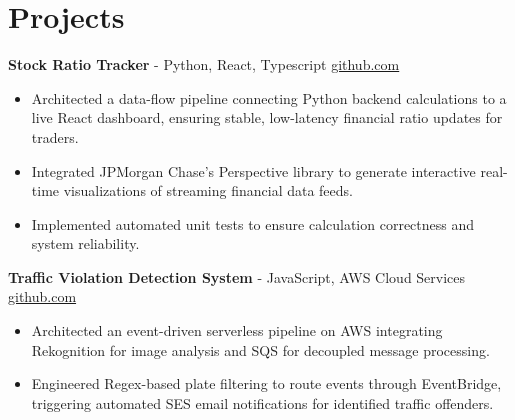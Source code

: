 \documentclass[11pt]{article}       %
\begin{document}
\vspace{-18.5pt}

\section*{Projects}

\textbf{Stock Ratio Tracker}{ - Python, React, Typescript} \hfill \href{https://github.com/Monica20030707/Trading-Dashboard_UI}{github.com} \\
\vspace{-9pt}
\begin{itemize}
  \item Architected a data-flow pipeline connecting Python backend calculations to a live React dashboard, ensuring stable, low-latency financial ratio updates for traders.
  \item Integrated JPMorgan Chase's Perspective library to generate interactive real-time visualizations of streaming financial data feeds.
  \item Implemented automated unit tests to ensure calculation correctness and system reliability.
\end{itemize}

\textbf{Traffic Violation Detection System}{ - JavaScript, AWS Cloud Services} \hfill \href{https://github.com/Monica20030707/AWS_rekonigition-N-read-database}{github.com} \\
\vspace{-9pt}
\begin{itemize}
  \item Architected an event-driven serverless pipeline on AWS integrating Rekognition for image analysis and SQS for decoupled message processing.
  \item Engineered Regex-based plate filtering to route events through EventBridge, triggering automated SES email notifications for identified traffic offenders.
\end{itemize}

\end{document}
